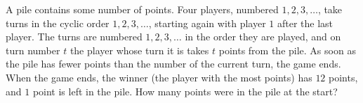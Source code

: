 A pile contains some number of points. Four players, numbered $1,2,3,\dots$, take turns in the cyclic order $1,2,3,\dots$, starting again with player $1$ after the last player. The turns are numbered $1,2,3,\dots$ in the order they are played, and on turn number $t$ the player whose turn it is takes $t$ points from the pile. As soon as the pile has fewer points than the number of the current turn, the game ends. When the game ends, the winner (the player with the most points) has $12$ points, and $1$ point is left in the pile. How many points were in the pile at the start?
